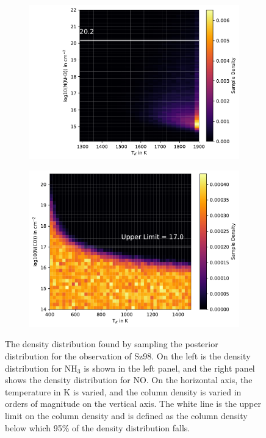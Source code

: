 \documentclass[oneside, single, authoryear, semicolon, 12pt]{lion-msc}
\newcommand{\4}{$_4$}
\newcommand{\3}{$_3$}
\newcommand{\2}{$_2$}
\begin{document}
\begin{figure}[!ht]
    \centering
    \begin{subfigure}[b]{0.49\textwidth}
        \centering
        \includegraphics[width=\textwidth]{radexpy_niels/Radexpy_for_Niels/upper_NH3_Sz98.pdf}
    \end{subfigure}
    \hfill
    \begin{subfigure}[b]{0.49\textwidth}
        \centering
        \includegraphics[width=\textwidth]{upper_CO_Sz98.pdf}
    \end{subfigure}
    \caption{The density distribution found by sampling the posterior distribution for the observation of Sz98. On the left is the density distribution for NH\3 is shown in the left panel, and the right panel shows the density distribution for NO. On the horizontal axis, the temperature in K is varied, and the column density is varied in orders of magnitude on the vertical axis. The white line is the upper limit on the column density and is defined as the column density below which 95\% of the density distribution falls.}
\end{figure}
\end{document}
